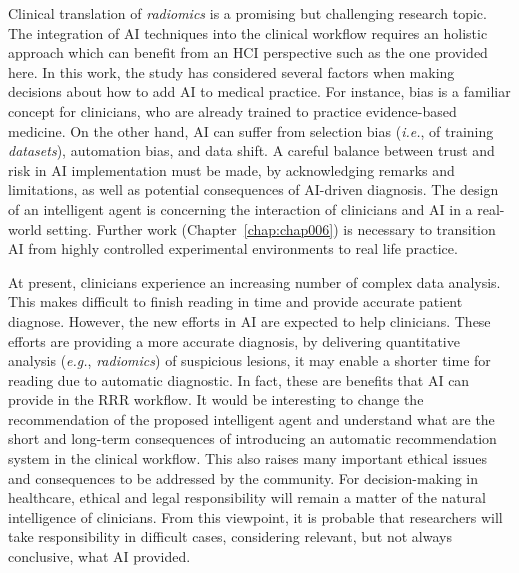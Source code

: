 Clinical translation of {\it radiomics} is a promising but challenging research topic.
The integration of \ac{AI} techniques into the clinical workflow requires an holistic approach which can benefit from an \ac{HCI} perspective such as the one provided here.
In this work, the study has considered several factors when making decisions about how to add \ac{AI} to medical practice.
For instance, bias is a familiar concept for clinicians, who are already trained to practice evidence-based medicine.
On the other hand, \ac{AI} can suffer from selection bias ({\it i.e.}, of training {\it datasets}), automation bias, and data shift.
A careful balance between trust and risk in \ac{AI} implementation must be made, by acknowledging remarks and limitations, as well as potential consequences of \ac{AI}-driven diagnosis.
The design of an intelligent agent is concerning the interaction of clinicians and \ac{AI} in a real-world setting.
Further work (Chapter~\ref{chap:chap006}) is necessary to transition \ac{AI} from highly controlled experimental environments to real life practice.

At present, clinicians experience an increasing number of complex data analysis.
This makes difficult to finish reading in time and provide accurate patient diagnose.
However, the new efforts in \ac{AI} are expected to help clinicians.
These efforts are providing a more accurate diagnosis, by delivering quantitative analysis ({\it e.g.}, {\it radiomics}) of suspicious lesions, it may enable a shorter time for reading due to automatic diagnostic.
In fact, these are benefits that \ac{AI} can provide in the \ac{RRR} workflow.
It would be interesting to change the recommendation of the proposed intelligent agent and understand what are the short and long-term consequences of introducing an automatic recommendation system in the clinical workflow.
This also raises many important ethical issues and consequences to be addressed by the community.
For decision-making in healthcare, ethical and legal responsibility will remain a matter of the natural intelligence of clinicians.
From this viewpoint, it is probable that researchers will take responsibility in difficult cases, considering relevant, but not always conclusive, what \ac{AI} provided.